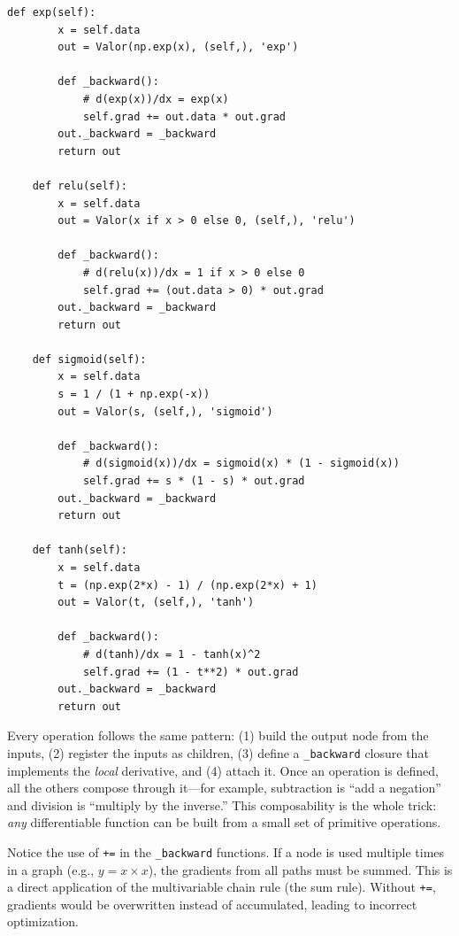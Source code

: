 \documentclass{tufte-handout}
\begin{document}
\begin{lstlisting}[caption={The \texttt{Valor} class in \texttt{mini\_nn/autograd.py}.}]
    def exp(self):
        x = self.data
        out = Valor(np.exp(x), (self,), 'exp')

        def _backward():
            # d(exp(x))/dx = exp(x)
            self.grad += out.data * out.grad
        out._backward = _backward
        return out

    def relu(self):
        x = self.data
        out = Valor(x if x > 0 else 0, (self,), 'relu')

        def _backward():
            # d(relu(x))/dx = 1 if x > 0 else 0
            self.grad += (out.data > 0) * out.grad
        out._backward = _backward
        return out

    def sigmoid(self):
        x = self.data
        s = 1 / (1 + np.exp(-x))
        out = Valor(s, (self,), 'sigmoid')

        def _backward():
            # d(sigmoid(x))/dx = sigmoid(x) * (1 - sigmoid(x))
            self.grad += s * (1 - s) * out.grad
        out._backward = _backward
        return out

    def tanh(self):
        x = self.data
        t = (np.exp(2*x) - 1) / (np.exp(2*x) + 1)
        out = Valor(t, (self,), 'tanh')

        def _backward():
            # d(tanh)/dx = 1 - tanh(x)^2
            self.grad += (1 - t**2) * out.grad
        out._backward = _backward
        return out
\end{lstlisting}

Every operation follows the same pattern: (1) build the output node from the inputs, (2) register the inputs as children, (3) define a \texttt{\_backward} closure that implements the \emph{local} derivative, and (4) attach it. Once an operation is defined, all the others compose through it---for example, subtraction is ``add a negation'' and division is ``multiply by the inverse.'' This composability is the whole trick: \emph{any} differentiable function can be built from a small set of primitive operations.

\begin{remark}[The \texttt{+=} Accumulation]
Notice the use of \texttt{+=} in the \texttt{\_backward} functions. If a node is used multiple times in a graph (e.g., $y = x \times x$), the gradients from all paths must be summed. This is a direct application of the multivariable chain rule (the sum rule). Without \texttt{+=}, gradients would be overwritten instead of accumulated, leading to incorrect optimization.
\end{remark}
\end{document}
